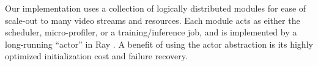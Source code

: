 Our implementation uses a collection of logically distributed modules for ease of scale-out to many video streams and resources. 
Each module acts as either the \name scheduler, micro-profiler, or a training/inference job, and is implemented by a long-running ``actor'' in Ray \cite{ray}. 
A benefit of using the actor abstraction is its highly optimized initialization cost and failure recovery. %


